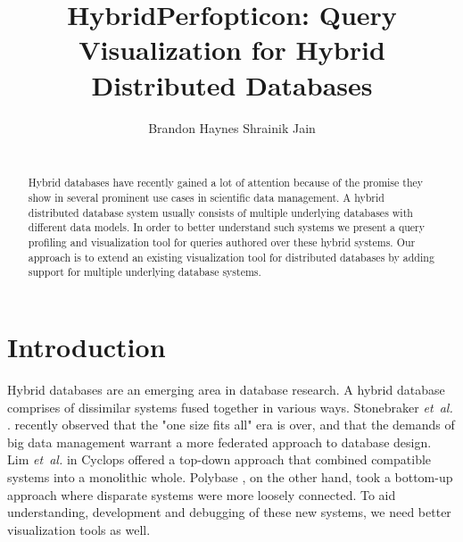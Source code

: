 \documentclass{chi2009}
\newcommand{\ea}{{\em et~al.} }
\begin{document}
\setlength{\paperheight}{11in}
\setlength{\paperwidth}{8.5in}
\setlength{\pdfpageheight}{\paperheight}
\setlength{\pdfpagewidth}{\paperwidth}

\toappear{}

\title{HybridPerfopticon: Query Visualization for Hybrid Distributed Databases}
\author{\alignauthor Brandon Haynes \hspace{3em} Shrainik Jain \\
 \\
} 

\maketitle

\begin{abstract}
Hybrid databases have recently gained a lot of attention because of the promise they show in several prominent use cases in scientific data management. A hybrid distributed database system usually consists of multiple underlying databases with different data models. In order to better understand such systems we present a query profiling and visualization tool for queries authored over these hybrid systems. Our approach is to extend an existing visualization tool for distributed databases  by adding support for multiple underlying database systems.
\end{abstract}



\section{Introduction}
Hybrid databases are an emerging area in database research. A hybrid database comprises of dissimilar systems fused together in various ways. Stonebraker \ea. \cite{stonebraker2007end} recently observed that the "one size fits all" era is over, and that the demands of big data management warrant a more federated approach to database design. Lim \ea in Cyclops \cite{cyclops} offered a top-down approach that combined compatible systems into a monolithic whole. Polybase \cite{polybase}, on the other hand, took a bottom-up approach where disparate systems were more loosely connected. To aid understanding, development and debugging of these new systems, we need better visualization tools as well. 
\end{document}
